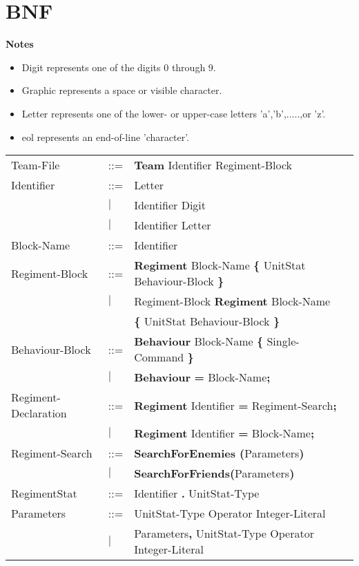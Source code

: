 \appendix
\chapter{BNF}
\label{app:bnf}
{\bf Notes}
\begin{itemize}
	\item Digit represents one of the digits 0 through 9.
	\item Graphic represents a space or visible character.
	\item Letter represents one of the lower- or upper-case letters 'a','b',.....,or 'z'.
	\item eol represents an end-of-line 'character'.
\end{itemize}
\begin{center}
		\begin{longtable}{l l l}
		\endfirsthead
		\endhead
Team-File					&	::=	&{\bf Team} Identifier Regiment-Block\\
Identifier					&	::=	&Letter\\
							&$\mid$	&Identifier Digit\\
							&$\mid$	&Identifier Letter\\
Block-Name					&	::=	&Identifier\\
Regiment-Block				&	::=	&{\bf Regiment} Block-Name {\bf \{ } UnitStat Behaviour-Block \bf{\} }\\
							&$\mid$	&Regiment-Block {\bf Regiment} Block-Name\\
							&		&{\bf \{ } UnitStat Behaviour-Block \bf{\} }\\
Behaviour-Block				&	::=	&{\bf Behaviour} Block-Name {\bf \{} Single-Command {\bf \}}  \\
							&$\mid$	& {\bf Behaviour} {\bf = } Block-Name{\bf ;} \\
Regiment-Declaration			&	::=	&{\bf Regiment} Identifier {\bf =} Regiment-Search{\bf ;}\\
							&$\mid$	&{\bf Regiment} Identifier {\bf =} Block-Name{\bf ;}\\
Regiment-Search				&	::=	&{\bf SearchForEnemies (}Parameters{\bf)}\\
							&$\mid$	&{\bf SearchForFriends(}Parameters{\bf)}\\
RegimentStat				&	::=	&Identifier {\bf.} UnitStat-Type \\
Parameters					&	::=	&UnitStat-Type Operator Integer-Literal\\
 							&$\mid$	&Parameters{\bf ,} UnitStat-Type Operator Integer-Literal\\

\end{longtable}
\end{center}
